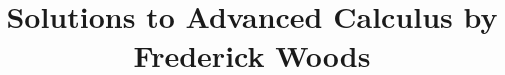 \documentclass[10pt]{article}
\begin{document}
\title{Solutions to Advanced Calculus by Frederick Woods}

\maketitle



\end{document}
